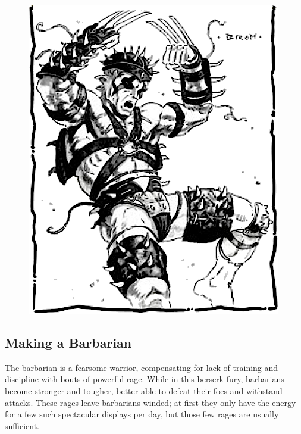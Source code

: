 \begin{figure}[t!]
\centering
\includegraphics[width=\columnwidth]{images/barbarian-1.png}
\WOTC
\end{figure}

\subsection{Making a Barbarian}

The barbarian is a fearsome warrior, compensating for lack of training and discipline with bouts of powerful rage. While in this berserk fury, barbarians become stronger and tougher, better able to defeat their foes and withstand attacks. These rages leave barbarians winded; at first they only have the energy for a few such spectacular displays per day, but those few rages are usually sufficient.

